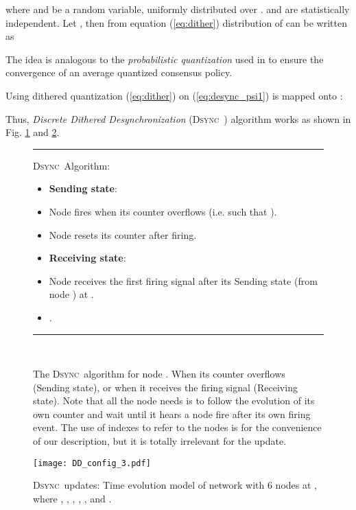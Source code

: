 \documentclass[conference]{IEEEtran}
\newcommand{\DDD}{\textsc{Dsync~}}
\theoremstyle{definition}
\theoremstyle{definition}
\begin{document}
where  and  be a random variable, uniformly distributed over .  and  are statistically independent. Let , then from equation (\ref{eq:dither}) distribution of   can be written as 

The idea is analogous to the \emph{probabilistic quantization} used in \cite{can} to ensure the convergence of an average quantized consensus policy.

Using dithered quantization (\ref{eq:dither}) on (\ref{eq:desync_psi1})  is mapped onto :

Thus, \emph{Discrete Dithered Desynchronization} (\DDD)  algorithm works as shown in Fig. \ref{fig:DDDesync1} and {\ref{fig:DD_update}}.
\begin{figure}[htb]
\centering \vrule
\begin{minipage}{\linewidth}
\hrule \vspace{0.25cm}
\begin{minipage}{0.95\linewidth}
\def\baselinestretch{1} 
\begin{center} \DDD Algorithm: \end{center}
\begin{itemize}
\item[] {\bf Sending state}:
\item[] Node  fires when its counter overflows (i.e.  such that ).
\item[] Node {} resets its counter  after firing.
\end{itemize}
	\begin{itemize} 
	\item[] {\bf Receiving state}:
		\item  Node  receives the first firing signal after its Sending state (from node ) at \mbox{}.
		\item .
	\end{itemize}
\end{minipage}
\vspace{1em} \hrule
\end{minipage}\vrule \\
\caption{The \DDD algorithm for node . When its counter overflows (Sending state), or when it receives the firing signal (Receiving state). Note that all the node needs is to follow the evolution of its own counter and wait until it hears a node fire after its own firing event. The use
of indexes to refer to the nodes is for the convenience of our description, but it is totally irrelevant for the update.}\label{fig:DDDesync1}
\end{figure}
\begin{figure}
\centering
\vspace{-0.15in}
\begin{minipage}[b]{0.6\linewidth}
\centerline{\texttt{[image: DD\_config\_3.pdf]}}
\hfill
\end{minipage}
\vspace{-0.3in}
\caption{\DDD updates: Time evolution model of network  with 6 nodes at , where , , , , ,  and .} 
\label{fig:DD_update}
\end{figure}
\end{document}
